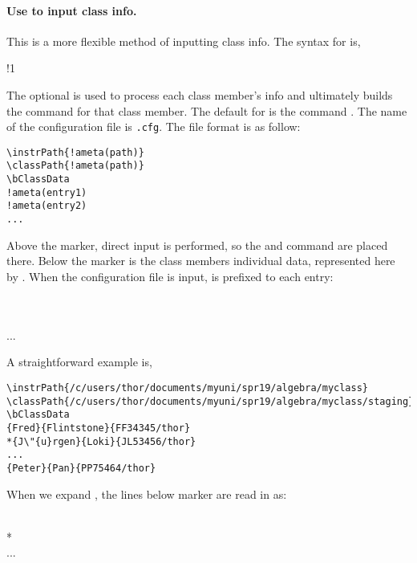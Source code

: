 \documentclass{article}
\edef\amtIndent{\the\parindent}
\begin{document}
\paragraph*{Use  to input class info.} This is a more flexible method
of inputting class info. The syntax for  is,
\bVerb\small{}%
\setlength{\eflength}{\bxSize}%
\def\1{\rlap{\hskip\eflength\%\textsf{ preamble only}}}%
\begin{dCmd}[commandchars=!()]{\bxSize}
!1
\end{dCmd}
\eVerb The optional  is used to process each class member's info and ultimately
builds the  command for that class member. The default for 
is the command . The name of the configuration file is
\texttt{.cfg}. The file format is as follow:
\begin{Verbatim}[xleftmargin=\amtIndent,fontsize=\small,commandchars=!()]
\instrPath{!ameta(path)}
\classPath{!ameta(path)}
\bClassData
!ameta(entry1)
!ameta(entry2)
...
\end{Verbatim}
Above the  marker, direct input is performed, so the 
and  command are placed there. Below the  marker is the
class members individual data, represented here by . When
the configuration file is input,  is prefixed to each entry:
\begin{flushleft}\ttfamily
{}\\
\\
...
\end{flushleft}
A straightforward example is,
\begin{Verbatim}[xleftmargin=\amtIndent,fontsize=\small]
\instrPath{/c/users/thor/documents/myuni/spr19/algebra/myclass}
\classPath{/c/users/thor/documents/myuni/spr19/algebra/myclass/staging}
\bClassData
{Fred}{Flintstone}{FF34345/thor}
*{J\"{u}rgen}{Loki}{JL53456/thor}
...
{Peter}{Pan}{PP75464/thor}
\end{Verbatim}
When we expand , the lines below
 marker are read in as:
\begin{flushleft}\ttfamily
{}\\
*\\
...\\
\end{flushleft}
\end{document}
